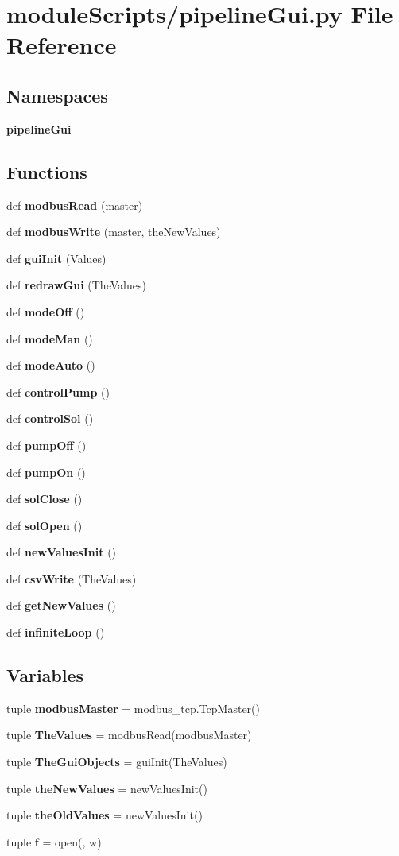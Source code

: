 \section{module\+Scripts/pipeline\+Gui.py File Reference}
\label{pipeline_gui_8py}
\subsection*{Namespaces}
\begin{DoxyCompactItemize}
\item 
 {\bf pipeline\+Gui}
\end{DoxyCompactItemize}
\subsection*{Functions}
\begin{DoxyCompactItemize}
\item 
def {\bf modbus\+Read} (master)
\item 
def {\bf modbus\+Write} (master, the\+New\+Values)
\item 
def {\bf gui\+Init} (Values)
\item 
def {\bf redraw\+Gui} (The\+Values)
\item 
def {\bf mode\+Off} ()
\item 
def {\bf mode\+Man} ()
\item 
def {\bf mode\+Auto} ()
\item 
def {\bf control\+Pump} ()
\item 
def {\bf control\+Sol} ()
\item 
def {\bf pump\+Off} ()
\item 
def {\bf pump\+On} ()
\item 
def {\bf sol\+Close} ()
\item 
def {\bf sol\+Open} ()
\item 
def {\bf new\+Values\+Init} ()
\item 
def {\bf csv\+Write} (The\+Values)
\item 
def {\bf get\+New\+Values} ()
\item 
def {\bf infinite\+Loop} ()
\end{DoxyCompactItemize}
\subsection*{Variables}
\begin{DoxyCompactItemize}
\item 
tuple {\bf modbus\+Master} = modbus\+\_\+tcp.\+Tcp\+Master()
\item 
tuple {\bf The\+Values} = modbus\+Read(modbus\+Master)
\item 
tuple {\bf The\+Gui\+Objects} = gui\+Init(The\+Values)
\item 
tuple {\bf the\+New\+Values} = new\+Values\+Init()
\item 
tuple {\bf the\+Old\+Values} = new\+Values\+Init()
\item 
tuple {\bf f} = open(\textquotesingle{}, \textquotesingle{}w\textquotesingle{})
\end{DoxyCompactItemize}
